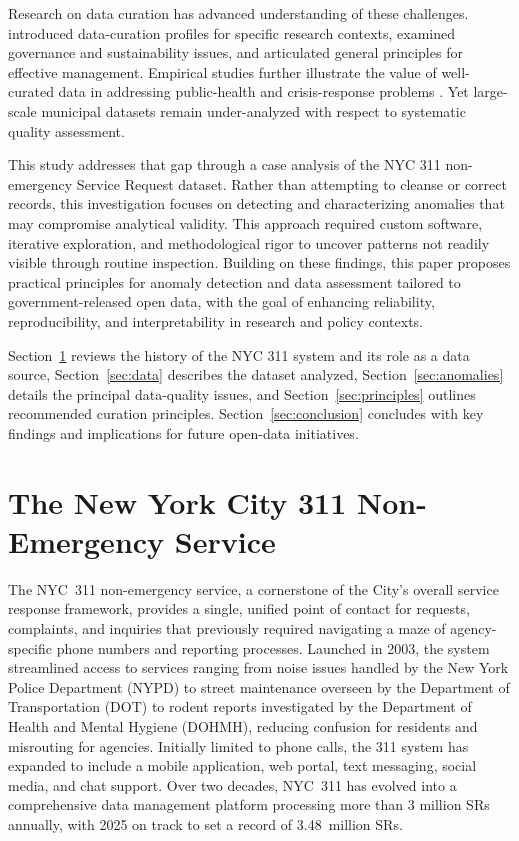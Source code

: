 \documentclass[linenumber]{jdsart}
\begin{document}
Research on data curation has advanced understanding of these challenges.
\citet{witt2009constructing} introduced data-curation profiles for specific
research contexts, \citet{borgman2012conundrum} examined governance and
sustainability issues, and \citet{hart2016ten} articulated general principles
for effective management. Empirical studies further illustrate the value of
well-curated data in addressing public-health and crisis-response problems
\citep{cantor2018facets,shankar2021data}. Yet large-scale municipal datasets
remain under-analyzed with respect to systematic quality assessment.

This study addresses that gap through a case analysis of the NYC 311
non-emergency Service Request dataset. Rather than attempting to cleanse or
correct records, this investigation focuses on detecting and characterizing
anomalies that may compromise analytical validity. This approach required
custom software, iterative exploration, and methodological rigor to uncover
patterns not readily visible through routine inspection. Building on these
findings, this paper proposes practical principles for anomaly detection and
data assessment tailored to government-released open data, with the goal of
enhancing reliability, reproducibility, and interpretability in research and
policy contexts.

Section~\ref{sec:service} reviews the history of the NYC 311 system and its
role as a data source, Section~\ref{sec:data} describes the dataset analyzed,
Section~\ref{sec:anomalies} details the principal data-quality issues, and
Section~\ref{sec:principles} outlines recommended curation principles.
Section~\ref{sec:conclusion} concludes with key findings and implications for
future open-data initiatives.


\section{The New York City 311 Non-Emergency Service}
\label{sec:service}
The NYC~311 non-emergency service, a cornerstone of the City’s overall service
response framework, provides a single, unified point of contact for requests,
complaints, and inquiries that previously required navigating a maze of
agency-specific phone numbers and reporting processes. Launched in 2003, the
system streamlined access to services ranging from noise issues handled by the
New York Police Department (NYPD) to street maintenance overseen by the
Department of Transportation (DOT) to rodent reports investigated by the
Department of Health and Mental Hygiene (DOHMH), reducing confusion for
residents and misrouting for agencies. Initially limited to phone calls, the
311 system has expanded to include a mobile application, web portal, text
messaging, social media, and chat support. Over two decades, NYC~311 has
evolved into a comprehensive data management platform processing more than
\num[round-precision=0]{3} {million} SRs annually, with 2025 on track to set a
record of \SI{3.48	}{million} SRs.
\end{document}

